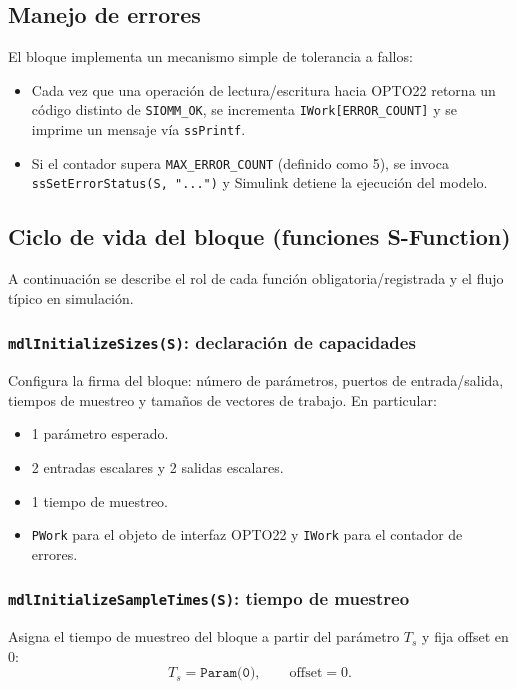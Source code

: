 \subsection{Manejo de errores}
El bloque implementa un mecanismo simple de tolerancia a fallos:
\begin{itemize}
    \item Cada vez que una operación de lectura/escritura hacia OPTO22 retorna un código distinto de \texttt{SIOMM\_OK}, se incrementa \texttt{IWork[ERROR\_COUNT]} y se imprime un mensaje vía \texttt{ssPrintf}.
    \item Si el contador supera \texttt{MAX\_ERROR\_COUNT} (definido como 5), se invoca \texttt{ssSetErrorStatus(S, "...")} y Simulink detiene la ejecución del modelo.
\end{itemize}

\subsection{Ciclo de vida del bloque (funciones S-Function)}
A continuación se describe el rol de cada función obligatoria/registrada y el flujo típico en simulación.

\subsubsection{\texttt{mdlInitializeSizes(S)}: declaración de capacidades}
Configura la firma del bloque: número de parámetros, puertos de entrada/salida, tiempos de muestreo y tamaños de vectores de trabajo. En particular:
\begin{itemize}
    \item 1 parámetro esperado.
    \item 2 entradas escalares y 2 salidas escalares.
    \item 1 tiempo de muestreo.
    \item \texttt{PWork} para el objeto de interfaz OPTO22 y \texttt{IWork} para el contador de errores.
\end{itemize}

\subsubsection{\texttt{mdlInitializeSampleTimes(S)}: tiempo de muestreo}
Asigna el tiempo de muestreo del bloque a partir del parámetro $T_s$ y fija offset en 0:
\[
    T_s = \texttt{Param(0)}, \qquad \text{offset} = 0.
\]

